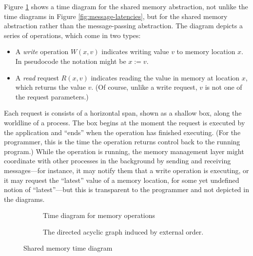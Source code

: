 \documentclass[]             %
{NASA}                       %
\theoremstyle{definition}
\begin{document}



Figure \ref{fig:external1} shows a time diagram for the shared memory
abstraction, not unlike the time diagrams in Figure
\ref{fig:message-latencies}, but for the shared memory abstraction
rather than the message-passing abstraction. The diagram depicts a
series of operations, which come in two types:
\begin{itemize}
  \item A \emph{write} operation $W(x, v)$ indicates writing value $v$
    to memory location $x$. In pseudocode the notation might be $x :=
    v$.
  \item A \emph{read} request $R(x, v)$ indicates reading the value in
    memory at location $x$, which returns the value $v$. (Of course,
    unlike a write request, $v$ is not one of the request parameters.)
\end{itemize}
Each request is consists of a horizontal span, shown as a shallow box,
along the worldline of a process. The box begins at the moment the
request is executed by the application and ``ends'' when the operation
has finished executing. (For the programmer, this is the time the
operation returns control back to the running program.) While the
operation is running, the memory management layer might coordinate
with other processes in the background by sending and receiving
messages---for instance, it may notify them that a write operation is
executing, or it may request the ``latest'' value of a memory
location, for some yet undefined notion of ``latest''---but this is
transparent to the programmer and not depicted in the diagrams.

\begin{figure}[p]
  \setlength\belowcaptionskip{5ex}

  \begin{subfigure}{1\textwidth}
    \centering
    
    \caption{Time diagram for memory operations}
    \label{fig:external1}
  \end{subfigure}

  \begin{subfigure}{1\textwidth}
    \centering 
    \caption{The directed acyclic graph induced by external order.}
    \label{fig:externalDAG}
  \end{subfigure}

  \caption{Shared memory time diagram}
  \label{fig:external}
\end{figure}
\end{document}
